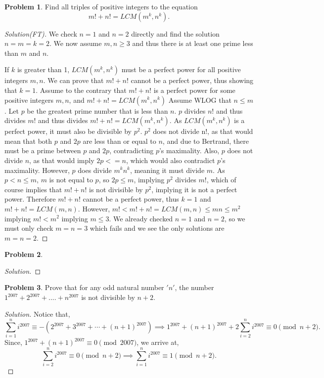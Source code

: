 \documentclass[a4paper,oneside,12 pt]{book}
\theoremstyle{definition}
\theoremstyle{definition}
\newtheorem{prbm}{Problem}[section]
\theoremstyle{definition}
\begin{document}
\begin{prbm}
Find all triples of positive integers to the equation
$$m!+n!=LCM(m^k,n^k).$$
\begin{proof} [Solution(FT)]
We check $n=1$ and $n=2$ directly and find the solution $n=m=k=2$. We now assume $m,n\geq 3$ and thus there is at least one prime less than $m$ and $n$.

If $k$ is greater than 1, $LCM(m^k,n^k)$ must be a perfect power for all positive integers $m, n$. We can prove that $m!+n!$ cannot be a perfect power, thus showing that $k=1$.
Assume to the contrary that $m!+n!$ is a perfect power for some positive integers $m, n$, and $m!+n!=LCM(m^k,n^k)$
Assume WLOG that $n\leq m$.
Let $p$ be the greatest prime number that is less than $n$.
$p$ divides $n!$ and thus divides $m!$ and thus divides $m!+n!=LCM(m^k,n^k)$. As $LCM(m^k,n^k)$ is a perfect power, it must also be divisible by $p^2$.
$p^2$ does not divide n!, as that would mean that both $p$ and $2p$ are less than or equal to $n$, and due to Bertrand, there must be a prime between $p$ and $2p$, contradicting $p$'s maximality. Also, $p$ does not divide $n$, as that would imply $2p<=n$, which would also contradict $p$'s maximality.
However, $p$ does divide $m^k n^k$, meaning it must divide $m$. As $p<n\leq m$, $m$ is not equal to $p$, so $2p\leq m$, implying $p^2$ divides $m!$, which of course implies that $m!+n!$ is not divisible by $p^2$, implying it is not a perfect power.
Therefore $m!+n!$ cannot be a perfect power, thus $k=1$ and $m!+n!=LCM(m,n)$.
However, $m!<m!+n!=LCM(m,n)\leq mn\leq m^2$ implying $m!<m^2$ implying  $m\leq 3$. We already checked $n=1$ and $n=2$, so we must only check $m=n=3$ which fails and we see the only solutions are $m=n=2$.
\end{proof}

\end{prbm}


\begin{prbm}


\begin{proof}[Solution]


\end{proof}

\end{prbm}


\begin{prbm}
 Prove that for any odd natural number $'n'$, the number $1^{2007}+2^{2007}+....+n^{2007}$ is not divisible by $n+2$.
\begin{proof}[Solution]
Notice that,
$$
\sum_{i=1}^n i^{2007}\equiv -(2^{2007}+3^{2007}+\cdots+(n+1)^{2007})\implies 1^{2007}+(n+1)^{2007}+2\sum_{i=2}^n i^{2007}\equiv 0 \pmod{n+2}.
$$Since, $1^{2007}+(n+1)^{2007}\equiv 0 \pmod{2007}$, we arrive at,
$$\sum_{i=2}^n i^{2007} \equiv 0 \pmod{n+2} \implies \sum_{i=1}^n i^{2007} \equiv 1 \pmod{n+2}.$$
\end{proof}

\end{prbm}
\end{document}
